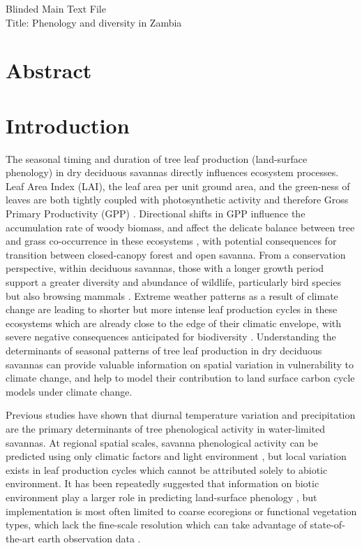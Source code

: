 \documentclass[11pt,a4paper]{article}
\newcommand{\titletext}{Phenology and diversity in Zambia}
\begin{document}
{\Large{Blinded Main Text File}}\\
{\Large{Title: \titletext{}}}

\section*{Abstract}

\section{Introduction}

The seasonal timing and duration of tree leaf production (land-surface phenology) in dry deciduous savannas directly influences ecosystem processes. Leaf Area Index (LAI), the leaf area per unit ground area, and the green-ness of leaves are both tightly coupled with photosynthetic activity and therefore Gross Primary Productivity (GPP) \citep{Gu2003, Penuelas2009}. Directional shifts in GPP influence the accumulation rate of woody biomass, and affect the delicate balance between tree and grass co-occurrence in these ecosystems \citep{Stevens2016}, with potential consequences for transition between closed-canopy forest and open savanna. From a conservation perspective, within deciduous savannas, those with a longer growth period support a greater diversity and abundance of wildlife, particularly bird species but also browsing mammals \citep{Cole2015, Araujo2017, Morellato2016, Ogutu2013}. Extreme weather patterns as a result of climate change are leading to shorter but more intense leaf production cycles in these ecosystems which are already close to the edge of their climatic envelope, with severe negative consequences anticipated for biodiversity \citep{Bale2002}. Understanding the determinants of seasonal patterns of tree leaf production in dry deciduous savannas can provide valuable information on spatial variation in vulnerability to climate change, and help to model their contribution to land surface carbon cycle models under climate change.

Previous studies have shown that diurnal temperature variation and precipitation are the primary determinants of tree phenological activity in water-limited savannas. At regional spatial scales, savanna phenological activity can be predicted using only climatic factors and light environment \citep{Adole2018a}, but local variation exists in leaf production cycles which cannot be attributed solely to abiotic environment. It has been repeatedly suggested that information on biotic environment play a larger role in predicting land-surface phenology \citep{Adole2018b, Jeganathan2014, Fuller1999}, but implementation is most often limited to coarse ecoregions or functional vegetation types, which lack the fine-scale resolution which can take advantage of state-of-the-art earth observation data \citep{}.
\end{document}
